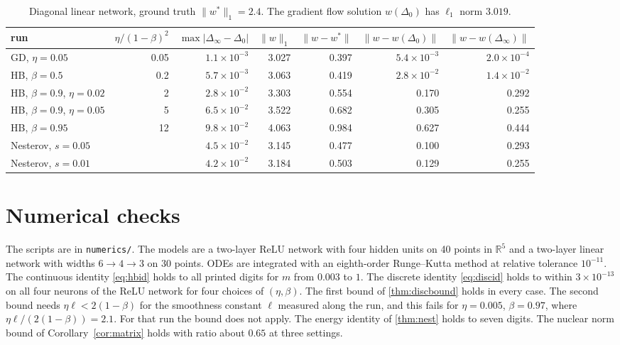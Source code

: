 \documentclass[11pt]{article}
\theoremstyle{remark}
\theoremstyle{definition}
\newcommand{\R}{\mathbb{R}}
\begin{document}
\begin{table}[t]
\centering\small
\setlength{\tabcolsep}{4pt}\begin{tabular}{lrrrrrr}
\toprule
run & $\eta/(1-\beta)^2$ & $\max|\Delta_\infty-\Delta_0|$ & $\|w\|_1$ & $\|w-w^\ast\|$ & $\|w-w(\Delta_0)\|$ & $\|w-w(\Delta_\infty)\|$\\
\midrule
GD, $\eta=0.05$ & 0.05 & $1.1\times10^{-3}$ & 3.027 & 0.397 & $5.4\times10^{-3}$ & $2.0\times10^{-4}$\\
HB, $\beta=0.5$ & 0.2 & $5.7\times10^{-3}$ & 3.063 & 0.419 & $2.8\times10^{-2}$ & $1.4\times10^{-2}$\\
HB, $\beta=0.9$, $\eta=0.02$ & 2 & $2.8\times10^{-2}$ & 3.303 & 0.554 & 0.170 & 0.292\\
HB, $\beta=0.9$, $\eta=0.05$ & 5 & $6.5\times10^{-2}$ & 3.522 & 0.682 & 0.305 & 0.255\\
HB, $\beta=0.95$ & 12 & $9.8\times10^{-2}$ & 4.063 & 0.984 & 0.627 & 0.444\\
Nesterov, $s=0.05$ & & $4.5\times10^{-2}$ & 3.145 & 0.477 & 0.100 & 0.293\\
Nesterov, $s=0.01$ & & $4.2\times10^{-2}$ & 3.184 & 0.503 & 0.129 & 0.255\\
\bottomrule
\end{tabular}
\caption{Diagonal linear network, ground truth $\|w^\ast\|_1=2.4$. The gradient flow solution $w(\Delta_0)$ has $\ell_1$ norm $3.019$.}
\label{tab:bias}
\end{table}

\section{Numerical checks}\label{sec:numerics}

The scripts are in \texttt{numerics/}. The models are a two-layer ReLU network with four hidden units on 40 points in $\R^5$ and a two-layer linear network with widths $6\to4\to3$ on 30 points. ODEs are integrated with an eighth-order Runge--Kutta method at relative tolerance $10^{-11}$. The continuous identity \eqref{eq:hbid} holds to all printed digits for $m$ from $0.003$ to $1$. The discrete identity \eqref{eq:discid} holds to within $3\times10^{-13}$ on all four neurons of the ReLU network for four choices of $(\eta,\beta)$. The first bound of \cref{thm:discbound} holds in every case. The second bound needs $\eta\ell<2(1-\beta)$ for the smoothness constant $\ell$ measured along the run, and this fails for $\eta=0.005$, $\beta=0.97$, where $\eta\ell/(2(1-\beta))=2.1$. For that run the bound does not apply. The energy identity of \cref{thm:nest} holds to seven digits. The nuclear norm bound of Corollary~\ref{cor:matrix} holds with ratio about $0.65$ at three settings.
\end{document}
